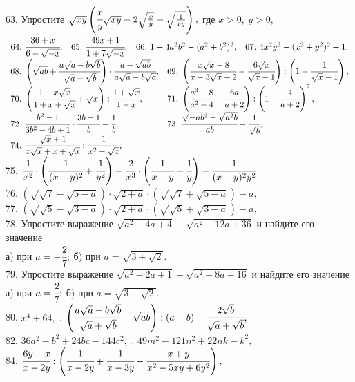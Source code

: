 \documentclass[12pt]{article}
\begin{document}
63. Упростите $\sqrt{xy}\left(\cfrac{x}{y}\sqrt{xy}-2\sqrt{\frac{x}{y}}+\sqrt{\frac{1}{xy}}\right),$ где $x>0,\ y>0,$\\
$\begin{array}{llll}
64.\ \cfrac{36+x}{6-\sqrt{-x}},&
65.\ \cfrac{49x+1}{1+7\sqrt{-x}},&
66.\ 1+4a^2b^2-(a^2+b^2)^2,&
67.\ 4x^2y^2-(x^2+y^2)^2+1,
\end{array}$\\
$\begin{array}{llll}
68.\ \left(\sqrt{ab}+\cfrac{a\sqrt{a}-b\sqrt{b}}{\sqrt{a}-\sqrt{b}}\right)\cdot\cfrac{a-\sqrt{ab}}{
a\sqrt{a}-b\sqrt{a}},&
69.\ \left(\cfrac{x\sqrt{x}-8}{x-3\sqrt{x}+2}-\cfrac{6\sqrt{x}}{\sqrt{x}-1}\right):
\left(1-\cfrac{1}{\sqrt{x}-1}\right),\\
70.\ \left(\cfrac{1-x\sqrt{x}}{1+x+\sqrt{x}}+\sqrt{x}\right): \cfrac{1+\sqrt{x}}{1-x},&
71.\ \left(\cfrac{a^3-8}{a^2-4}-\cfrac{6a}{a+2}\right): \left(1-\cfrac{4}{a+2}\right)^2,\\
72.\ \cfrac{b^2-1}{3b^2-4b+1}\cdot\cfrac{3b-1}{b}-\cfrac{1}{b},&
73.\ \cfrac{\sqrt{-ab^2}-\sqrt{a^2b}}{ab}-\cfrac{1}{\sqrt{b}},\\
74.\ \cfrac{\sqrt{x}+1}{x\sqrt{x}+x+\sqrt{x}}:\cfrac{1}{x^2-\sqrt{x}},\end{array}$\\
75. $\cfrac{1}{x^2}\cdot\left(\cfrac{1}{(x-y)^2}+\cfrac{1}{y^2}\right)+\cfrac{2}{x^3}\cdot\left(
\cfrac{1}{x-y}+\cfrac{1}{y}\right)-\cfrac{1}{(x-y)^2y^2}.$\\
76. $\left(\sqrt{\sqrt{7}-\sqrt{5-a}}\right)\cdot\sqrt{2+a}\cdot\left(\sqrt{\sqrt{7}+\sqrt{5-a}}\right)-a,$\\
77. $\left(\sqrt{\sqrt{5}-\sqrt{3-a}}\right)\cdot\sqrt{2+a}\cdot\left(\sqrt{\sqrt{5}+\sqrt{3-a}}\right)-a,$\\
78. Упростите выражение $\sqrt{a^2-4a+4}+\sqrt{a^2-12a+36}$ и найдите его значение\\
а) при $a=-\cfrac{2}{7};$ б) при $a=\sqrt{3+\sqrt{2}}.$\\
79. Упростите выражение $\sqrt{a^2-2a+1}+\sqrt{a^2-8a+16}$ и найдите его значение\\
а) при $a=\cfrac{2}{7};$ б) при $a=\sqrt{3-\sqrt{2}}.$\\
80. $x^4+64,$ \qquad {}. $\left(\cfrac{a\sqrt{a}+b\sqrt{b}}{\sqrt{a}+\sqrt{b}}-\sqrt{ab}\right):(a-b)+\cfrac{2\sqrt{b}}{\sqrt{a}+\sqrt{b}},$\\
82. $36a^2-b^2+24bc-144c^2,$ \qquad {}. $49m^2-121n^2+22nk-k^2,$\\
84. $\cfrac{6y-x}{x-2y}:\left(\cfrac{1}{x-2y}+\cfrac{1}{x-3y}-\cfrac{x+y}{x^2-5xy+6y^2}\right),$
\end{document}
